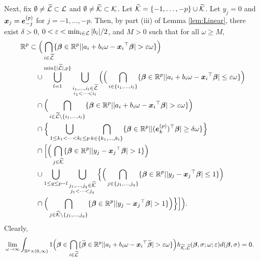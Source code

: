 \documentclass[12pt]{article}
\def\ep{{\varepsilon}}
\def\si{{\sigma}}
\def\de{{\delta}}
\def\ep{{\varepsilon}}
\def\si{{\sigma}}
\def\om{{\omega}}
\def\non{{\nonumber}}
\def\Lc{{\cal L}}
\def\Kc{{\cal K}}
\def\de{{\delta}}
\def\ep{{\varepsilon}}
\def\si{{\sigma}}
\def\om{{\omega}}
\def\bbe{{\text{\boldmath $\beta$}}}
\def\bbet{{\widetilde \bbe}}
\def\e{{\text{\boldmath $e$}}}
\def\x{{\text{\boldmath $x$}}}
\def\Lc{{\cal L}}
\def\Kc{{\cal K}}
\def\non{{\nonumber}}
\begin{document}
Next, fix $\emptyset \neq \widetilde{\Lc } \subset \Lc $ and $\emptyset \neq \widetilde{\Kc } \subset \Kc $. 
Let $\widehat{\Kc } = \{ - 1, \dots , - p \} \cup \widetilde{\Kc }$. 
Let $y_j = 0$ and $\x _j = \e _{- j}^{(p)}$ for $j = - 1, \dots , - p$. 
Then, by part (iii) of Lemma \ref{lem:Linear}, there exist $\de > 0$, $0 < \ep < \min_{i \in \Lc } | b_i | / 2$, and $M > 0$ such that for all $\om \ge M$, 
\begin{align}
\mathbb{R} ^p &\subset \Big( \bigcap_{i \in \widetilde{\Lc }} \{ \bbe \in \mathbb{R} ^p | | a_i + b_i \om - {\x _i}^{\top } \bbe | > \ep \om \} \Big) \non \\
&\quad \cup \bigcup_{l = 1}^{\min \{ | \widetilde{\Lc } |, p \} } \bigcup_{\substack{i_1 , \dots , i_l \in \widetilde{\Lc } \\ i_1 < \dots < i_l}} \Big( \Big( \bigcap_{i \in \{ i_1 , \dots , i_l \} } \{ \bbe \in \mathbb{R} ^p | | a_i + b_i \om - {\x _i}^{\top } \bbe | \le \ep \om \} \Big) \non \\
&\quad \cap \Big( \bigcap_{i \in \widetilde{\Lc } \setminus \{ i_1 , \dots , i_l \} } \{ \bbe \in \mathbb{R} ^p | | a_i + b_i \om - {\x _i}^{\top } \bbe | > \ep \om \} \Big) \non \\
&\quad \cap \Big\{ \bigcup_{1 \le k_1 < \dots < k_l \le p} \bigcap_{k \in \{ k_1 , \dots , k_l \} } \{ \bbe \in \mathbb{R} ^p | |( \e _{k}^{(p)} )^{\top } \bbe | \ge \de \om \} \Big\} \non \\
&\quad \cap \Big[ \Big( \bigcap_{j \in \widehat{\Kc }} \{ \bbe \in \mathbb{R} ^p | | y_j - {\x _j}^{\top } \bbe | > 1 \} \Big) \non \\
&\quad \cup \bigcup_{1 \le q \le p - l} \bigcup_{\substack{j_1 , \dots , j_q \in \widehat{\Kc } \\ j_1 < \dots < j_q}} \Big\{ \Big( \bigcap_{j \in \{ j_1 , \dots , j_q \} } \{ \bbe \in \mathbb{R} ^p | | y_j - {\x _j}^{\top } \bbe | \le 1 \} \Big) \non \\
&\quad \cap \Big( \bigcap_{j \in \widehat{\Kc } \setminus \{ j_1 , \dots , j_q \} } \{ \bbe \in \mathbb{R} ^p | | y_j - {\x _j}^{\top } \bbe | > 1 \} \Big) \Big\} \Big] \Big) \text{.} \non 
\end{align}
Clearly, 
\begin{align}
&\lim_{\om \to \infty } \int_{\mathbb{R} ^p \times (0, \infty )} 1\Big( \bbe \in \bigcap_{i \in \widetilde{\Lc }} \{ \bbet \in \mathbb{R} ^p | | a_i + b_i \om - {\x _i}^{\top } \bbet | > \ep \om \} \Big) h_{\widetilde{\Kc } , \widetilde{\Lc }} ( \bbe , \si ; \om ; \ep ) d( \bbe , \si ) = 0 \text{.} \non 
\end{align}
\end{document}
